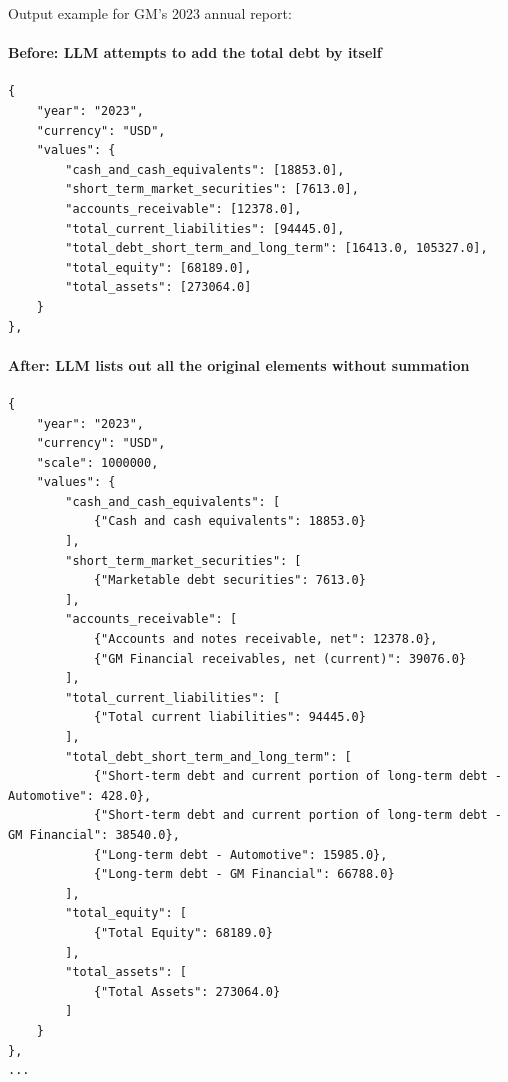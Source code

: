 \documentclass[12pt,a4paper]{article}
\begin{document}
Output example for GM's 2023 annual report:

\paragraph{Before: LLM attempts to add the total debt by itself}

\begin{lstlisting}[style=json, caption={GM 2023 extraction (original): LLM attempts to sum debt components}, label=lst:extraction_before]
{
    "year": "2023",
    "currency": "USD",
    "values": {
        "cash_and_cash_equivalents": [18853.0],
        "short_term_market_securities": [7613.0],
        "accounts_receivable": [12378.0],
        "total_current_liabilities": [94445.0],
        "total_debt_short_term_and_long_term": [16413.0, 105327.0],
        "total_equity": [68189.0],
        "total_assets": [273064.0]
    }
},
\end{lstlisting}

\paragraph{After: LLM lists out all the original elements without summation}

\begin{lstlisting}[style=json, caption={GM 2023 extraction (improved): source labels prevent hallucinated summation}, label=lst:extraction_after]
{
    "year": "2023",
    "currency": "USD",
    "scale": 1000000,
    "values": {
        "cash_and_cash_equivalents": [
            {"Cash and cash equivalents": 18853.0}
        ],
        "short_term_market_securities": [
            {"Marketable debt securities": 7613.0}
        ],
        "accounts_receivable": [
            {"Accounts and notes receivable, net": 12378.0},
            {"GM Financial receivables, net (current)": 39076.0}
        ],
        "total_current_liabilities": [
            {"Total current liabilities": 94445.0}
        ],
        "total_debt_short_term_and_long_term": [
            {"Short-term debt and current portion of long-term debt - Automotive": 428.0},
            {"Short-term debt and current portion of long-term debt - GM Financial": 38540.0},
            {"Long-term debt - Automotive": 15985.0},
            {"Long-term debt - GM Financial": 66788.0}
        ],
        "total_equity": [
            {"Total Equity": 68189.0}
        ],
        "total_assets": [
            {"Total Assets": 273064.0}
        ]
    }
},
...
\end{lstlisting}
\end{document}
